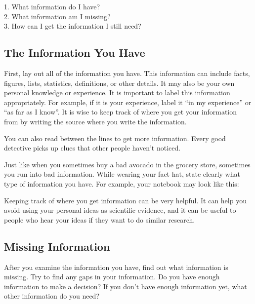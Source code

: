 1. What information do I have? \\
2. What information am I missing? \\
3. How can I get the information I still need?

\subsection*{The Information You Have}
First, lay out all of the information you have. This information can include facts, figures, lists, statistics, definitions, or other details. It may also be your own personal knowledge or experience. It is important to label this information appropriately. For example, if it is your experience, label it ``in my experience'' or ``as far as I know''. It is wise to keep track of where you get your information from by writing the source where you write the information.

You can also read between the lines to get more information. Every good detective picks up clues that other people haven't noticed.

Just like when you sometimes buy a bad avocado in the grocery store, sometimes you run into bad information. While wearing your fact hat, state clearly what type of information you have. For example, your notebook may look like this:



Keeping track of where you get information can be very helpful. It can help you avoid using your personal ideas as scientific evidence, and it can be useful to people who hear your ideas if they want to do similar research.

\subsection*{Missing Information}
After you examine the information you have, find out what information is missing. Try to find any gaps in your information. Do you have enough information to make a decision? If you don't have enough information yet, what other information do you need?


